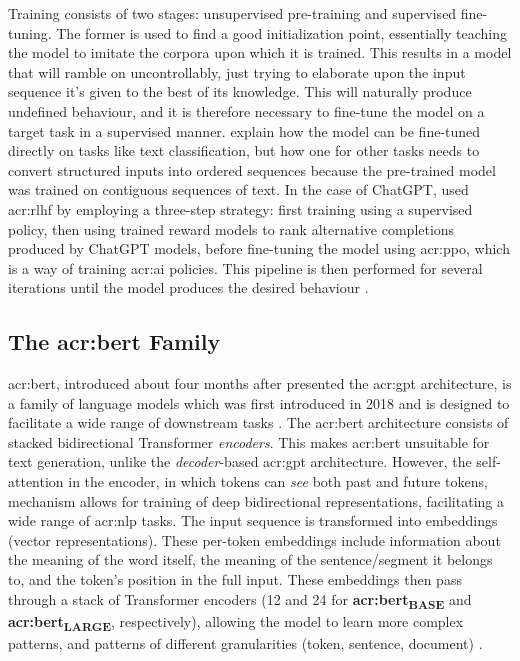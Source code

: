 Training consists of two stages: unsupervised pre-training and supervised fine-tuning. The former is used to find a good initialization point, essentially teaching the model to imitate the corpora upon which it is trained. This results in a model that will ramble on uncontrollably, just trying to elaborate upon the input sequence it's given to the best of its knowledge. This will naturally produce undefined behaviour, and it is therefore necessary to fine-tune the model on a target task in a supervised manner. \cite[4]{radfordImprovingLanguageUnderstanding2018} explain how the model can be fine-tuned directly on tasks like text classification, but how one for other tasks needs to convert structured inputs into ordered sequences because the pre-trained model was trained on contiguous sequences of text. In the case of ChatGPT, \citeauthor{openaiIntroducingChatGPT2022} used \gls{acr:rlhf} by employing a three-step strategy: first training using a supervised policy, then using trained reward models to rank alternative completions produced by ChatGPT models, before fine-tuning the model using \gls{acr:ppo}, which is a way of training \acrshort{acr:ai} policies. This pipeline is then performed for several iterations until the model produces the desired behaviour \citep{openaiIntroducingChatGPT2022}.

\subsection[The BERT Family]{The \acrshort{acr:bert} Family}\label{subsec:bert}

\gls{acr:bert}, introduced about four months after \cite{radfordImprovingLanguageUnderstanding2018} presented the \acrshort{acr:gpt} architecture, is a family of language models which was first introduced in 2018 and is designed to facilitate a wide range of downstream tasks \citep[5]{devlinBERTPretrainingDeep2019}. The \acrshort{acr:bert} architecture consists of stacked bidirectional Transformer \textit{encoders}. This makes \acrshort{acr:bert} unsuitable for text generation, unlike the \textit{decoder}-based \acrshort{acr:gpt} architecture. However, the self-attention in the encoder, in which tokens can \textit{see} both past and future tokens, mechanism allows for training of deep bidirectional representations, facilitating a wide range of \gls{acr:nlp} tasks. The input sequence is transformed into embeddings (vector representations). These per-token embeddings include information about the meaning of the word itself, the meaning of the sentence/segment it belongs to, and the token's position in the full input. These embeddings then pass through a stack of Transformer encoders (12 and 24 for \textbf{\acrshort{acr:bert}\textsubscript{BASE}} and \textbf{\acrshort{acr:bert}\textsubscript{LARGE}}, respectively), allowing the model to learn more complex patterns, and patterns of different granularities (token, sentence, document) \citep[5]{devlinBERTPretrainingDeep2019}.

